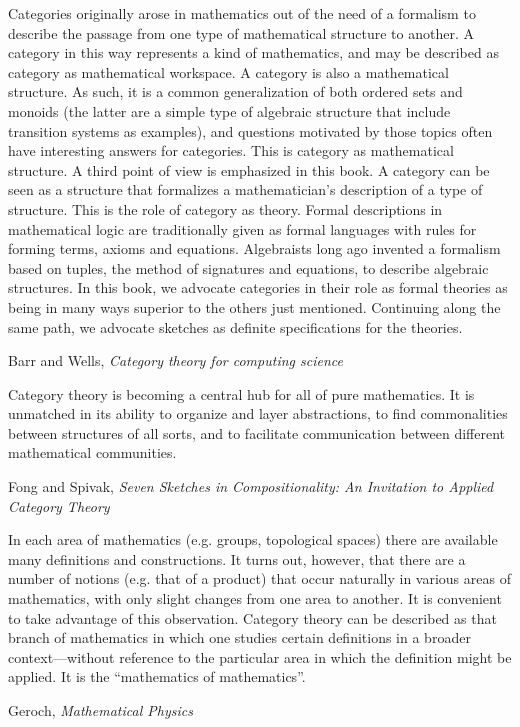 \documentclass[11pt,openany]{article}
\begin{document}
\epigraph{Categories originally arose in mathematics out of the need of a formalism to
describe the passage from one type of mathematical structure to another. A
category in this way represents a kind of mathematics, and may be described
as category as mathematical workspace.
A category is also a mathematical structure. As such, it is a common
generalization of both ordered sets and monoids (the latter are a simple
type of algebraic structure that include transition systems as examples),
and questions motivated by those topics often have interesting answers for
categories. This is category as mathematical structure.
A third point of view is emphasized in this book. A category can be seen
as a structure that formalizes a mathematician's description of a type of
structure. This is the role of category as theory. Formal descriptions in
mathematical logic are traditionally given as formal languages with rules for
forming terms, axioms and equations. Algebraists long ago invented a formalism
based on tuples, the method of signatures and equations, to describe
algebraic structures. In this book, we advocate categories in their role as formal
theories as being in many ways superior to the others just mentioned.
Continuing along the same path, we advocate sketches as definite specifications
for the theories.}
{Barr and Wells, \textit{Category theory for computing science}~\cite{barr-wells-2020}}

\epigraph{Category theory is becoming a central hub for all of pure mathematics. It is unmatched
in its ability to organize and layer abstractions, to find commonalities between structures
of all sorts, and to facilitate communication between different mathematical
communities.}
{Fong and Spivak, \textit{Seven Sketches in Compositionality: 
An Invitation to Applied Category Theory}~\cite{fong-spivakd-2018-seven-sketches}}

\pagebreak
\epigraph{In each area of mathematics 
(e.g. groups, topological spaces) 
there are available many definitions and constructions.
It turns out, however, that there are a number of notions
(e.g. that of a product) that occur naturally 
in various areas of mathematics, with only slight changes from
one area to another.
It is convenient to take advantage of this observation.
Category theory can be described as that branch of mathematics
in which one studies certain definitions in a broader context---without
reference to the particular area 
in which the definition might be applied.
It is the ``mathematics of mathematics''.}
{Geroch, \textit{Mathematical Physics}~\cite{geroch-1985}}
\end{document}
